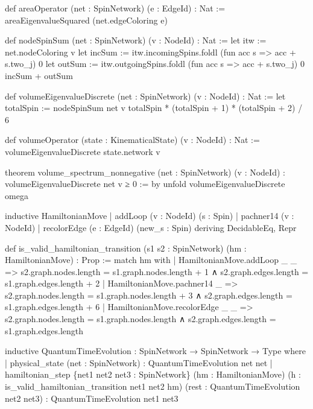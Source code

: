 \documentclass{article}
\newenvironment{Shaded}{%
  \begin{snugshade}%
}{%
  \end{snugshade}%
}%
\newenvironment{Highlighting}{%
}{%
}%
\newcommand{\NormalTok}[1]{#1}
\begin{document}
\begin{Shaded}
\begin{Highlighting}[]
\NormalTok{def areaOperator (net : SpinNetwork) (e : EdgeId) : Nat :=}
\NormalTok{  areaEigenvalueSquared (net.edgeColoring e)}

\NormalTok{def nodeSpinSum (net : SpinNetwork) (v : NodeId) : Nat :=}
\NormalTok{  let itw := net.nodeColoring v}
\NormalTok{  let incSum := itw.incomingSpins.foldl (fun acc s =\textgreater{} acc + s.two\_j) 0}
\NormalTok{  let outSum := itw.outgoingSpins.foldl (fun acc s =\textgreater{} acc + s.two\_j) 0}
\NormalTok{  incSum + outSum}

\NormalTok{def volumeEigenvalueDiscrete (net : SpinNetwork) (v : NodeId) : Nat :=}
\NormalTok{  let totalSpin := nodeSpinSum net v}
\NormalTok{  totalSpin * (totalSpin + 1) * (totalSpin + 2) / 6}

\NormalTok{def volumeOperator (state : KinematicalState) (v : NodeId) : Nat :=}
\NormalTok{  volumeEigenvalueDiscrete state.network v}

\NormalTok{theorem volume\_spectrum\_nonnegative (net : SpinNetwork) (v : NodeId) :}
\NormalTok{  volumeEigenvalueDiscrete net v ≥ 0 := by}
\NormalTok{  unfold volumeEigenvalueDiscrete}
\NormalTok{  omega}

\NormalTok{inductive HamiltonianMove}
\NormalTok{  | addLoop (v : NodeId) (s : Spin)                  }
\NormalTok{  | pachner14 (v : NodeId)                           }
\NormalTok{  | recolorEdge (e : EdgeId) (new\_s : Spin)          }
\NormalTok{  deriving DecidableEq, Repr}

\NormalTok{def is\_valid\_hamiltonian\_transition (s1 s2 : SpinNetwork) (hm : HamiltonianMove) : Prop :=}
\NormalTok{  match hm with}
\NormalTok{  | HamiltonianMove.addLoop \_ \_ =\textgreater{} }
\NormalTok{      s2.graph.nodes.length = s1.graph.nodes.length + 1 ∧}
\NormalTok{      s2.graph.edges.length = s1.graph.edges.length + 2}
\NormalTok{  | HamiltonianMove.pachner14 \_ =\textgreater{} }
\NormalTok{      s2.graph.nodes.length = s1.graph.nodes.length + 3 ∧}
\NormalTok{      s2.graph.edges.length = s1.graph.edges.length + 6}
\NormalTok{  | HamiltonianMove.recolorEdge \_ \_ =\textgreater{} }
\NormalTok{      s2.graph.nodes.length = s1.graph.nodes.length ∧}
\NormalTok{      s2.graph.edges.length = s1.graph.edges.length}

\NormalTok{inductive QuantumTimeEvolution : SpinNetwork → SpinNetwork → Type where}
\NormalTok{  | physical\_state (net : SpinNetwork) : QuantumTimeEvolution net net}
\NormalTok{  | hamiltonian\_step \{net1 net2 net3 : SpinNetwork\} (hm : HamiltonianMove)}
\NormalTok{      (h : is\_valid\_hamiltonian\_transition net1 net2 hm)}
\NormalTok{      (rest : QuantumTimeEvolution net2 net3) : QuantumTimeEvolution net1 net3}


\end{Highlighting}
\end{Shaded}
\end{document}
